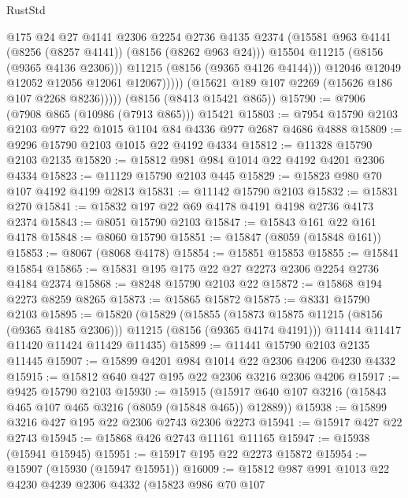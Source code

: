 \begin{lexlean}{RustStd}
\begin{coremodule}
{\begin{coremodule}
{{{{{{{{{{{{{{{{{{{{{{{{{{{{{{{{{{                        @175
                        @24
                        @27
                        @4141
                        @2306
                        @2254
                        @2736
                        @4135
                        @2374
                        (@15581 @963 @4141 (@8256 (@8257 @4141)) (@8156 (@8262 @963 @24)))
                        @15504
                        @11215
                        (@8156 (@9365 @4136 @2306)))
                      @11215
                      (@8156 (@9365 @4126 @4144)))
                    @12046
                    @12049
                    @12052
                    @12056
                    @12061
                    @12067)))))
          (@15621 @189 @107 @2269 (@15626 @186 @107 @2268 @8236)))))
    (@8156 (@8413 @15421 @865))
@15790 := @7906 (@7908 @865 (@10986 (@7913 @865))) @15421
@15803 := @7954 @15790 @2103 @2103 @977 @22 @1015 @1104 @84 @4336 @977 @2687 @4686 @4888
@15809 := @9296 @15790 @2103 @1015 @22 @4192 @4334
@15812 := @11328 @15790 @2103 @2135
@15820 := @15812 @981 @984 @1014 @22 @4192 @4201 @2306 @4334
@15823 := @11129 @15790 @2103 @445
@15829 := @15823 @980 @70 @107 @4192 @4199 @2813
@15831 := @11142 @15790 @2103
@15832 := @15831 @270
@15841 := @15832 @197 @22 @69 @4178 @4191 @4198 @2736 @4173 @2374
@15843 := @8051 @15790 @2103
@15847 := @15843 @161 @22 @161 @4178
@15848 := @8060 @15790
@15851 := @15847 (@8059 (@15848 @161))
@15853 := @8067 (@8068 @4178)
@15854 := @15851 @15853
@15855 := @15841 @15854
@15865 := @15831 @195 @175 @22 @27 @2273 @2306 @2254 @2736 @4184 @2374
@15868 := @8248 @15790 @2103 @22
@15872 := @15868 @194 @2273 @8259 @8265
@15873 := @15865 @15872
@15875 := @8331 @15790 @2103
@15895 := @15820
    (@15829
      (@15855 (@15873 @15875 @11215 (@8156 (@9365 @4185 @2306))) @11215 (@8156 (@9365 @4174 @4191)))
      @11414
      @11417
      @11420
      @11424
      @11429
      @11435)
@15899 := @11441 @15790 @2103 @2135 @11445
@15907 := @15899 @4201 @984 @1014 @22 @2306 @4206 @4230 @4332
@15915 := @15812 @640 @427 @195 @22 @2306 @3216 @2306 @4206
@15917 := @9425 @15790 @2103
@15930 := @15915 (@15917 @640 @107 @3216 (@15843 @465 @107 @465 @3216 (@8059 (@15848 @465)) @12889))
@15938 := @15899 @3216 @427 @195 @22 @2306 @2743 @2306 @2273
@15941 := @15917 @427 @22 @2743
@15945 := @15868 @426 @2743 @11161 @11165
@15947 := @15938 (@15941 @15945)
@15951 := @15917 @195 @22 @2273 @15872
@15954 := @15907 (@15930 (@15947 @15951))
@16009 := @15812
    @987
    @991
    @1013
    @22
    @4230
    @4239
    @2306
    @4332
    (@15823
      @986
      @70
      @107
}}}}}}}}}}}}}}}}}}}}}}}}}}}}}}}}}}
\end{coremodule}}
\end{coremodule}
\end{lexlean}
